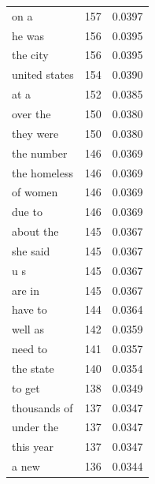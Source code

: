 \begin{tabular}{lrl}
on a & 157 & 0.0397 \\
he was & 156 & 0.0395 \\
the city & 156 & 0.0395 \\
united states & 154 & 0.0390 \\
at a & 152 & 0.0385 \\
over the & 150 & 0.0380 \\
they were & 150 & 0.0380 \\
the number & 146 & 0.0369 \\
the homeless & 146 & 0.0369 \\
of women & 146 & 0.0369 \\
due to & 146 & 0.0369 \\
about the & 145 & 0.0367 \\
she said & 145 & 0.0367 \\
u s & 145 & 0.0367 \\
are in & 145 & 0.0367 \\
have to & 144 & 0.0364 \\
well as & 142 & 0.0359 \\
need to & 141 & 0.0357 \\
the state & 140 & 0.0354 \\
to get & 138 & 0.0349 \\
thousands of & 137 & 0.0347 \\
under the & 137 & 0.0347 \\
this year & 137 & 0.0347 \\
a new & 136 & 0.0344 \\
\bottomrule
\end{tabular}

